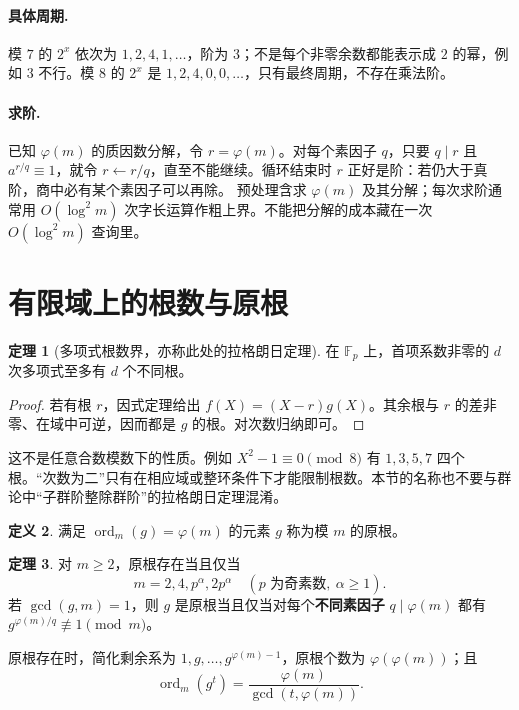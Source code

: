 \documentclass[UTF8,a4paper,11pt,oneside,openany,fontset=fandol]{ctexbook}
\theoremstyle{definition}
\newtheorem{definition}{定义}[chapter]
\newtheorem{theorem}[definition]{定理}
\newcommand{\ord}{\operatorname{ord}}
\begin{document}
\paragraph{具体周期.} 模 $7$ 的 $2^x$ 依次为 $1,2,4,1,\ldots$，阶为 $3$；不是每个非零余数都能表示成 $2$ 的幂，例如 $3$ 不行。模 $8$ 的 $2^x$ 是 $1,2,4,0,0,\ldots$，只有最终周期，不存在乘法阶。
\paragraph{求阶.} 已知 $\varphi(m)$ 的质因数分解，令 $r=\varphi(m)$。对每个素因子 $q$，只要 $q\mid r$ 且 $a^{r/q}\equiv1$，就令 $r\gets r/q$，直至不能继续。循环结束时 $r$ 正好是阶：若仍大于真阶，商中必有某个素因子可以再除。
预处理含求 $\varphi(m)$ 及其分解；每次求阶通常用 $O(\log^2m)$ 次字长运算作粗上界。不能把分解的成本藏在一次 $O(\log^2m)$ 查询里。


\section{有限域上的根数与原根}
\begin{theorem}[多项式根数界，亦称此处的拉格朗日定理]
在 $\mathbb F_p$ 上，首项系数非零的 $d$ 次多项式至多有 $d$ 个不同根。
\end{theorem}
\begin{proof}
若有根 $r$，因式定理给出 $f(X)=(X-r)g(X)$。其余根与 $r$ 的差非零、在域中可逆，因而都是 $g$ 的根。对次数归纳即可。
\end{proof}

\begin{pitfall}
这不是任意合数模数下的性质。例如 $X^2-1\equiv0\pmod8$ 有 $1,3,5,7$ 四个根。“次数为二”只有在相应域或整环条件下才能限制根数。本节的名称也不要与群论中“子群阶整除群阶”的拉格朗日定理混淆。
\end{pitfall}


\begin{definition}
满足 $\ord_m(g)=\varphi(m)$ 的元素 $g$ 称为模 $m$ 的原根。
\end{definition}
\begin{theorem}
对 $m\ge2$，原根存在当且仅当
\[
 m=2,4,p^\alpha,2p^\alpha\quad(p\text{ 为奇素数},\ \alpha\ge1).
\]
若 $\gcd(g,m)=1$，则 $g$ 是原根当且仅当对每个\textbf{不同素因子} $q\mid\varphi(m)$ 都有 $g^{\varphi(m)/q}\not\equiv1\pmod m$。
\end{theorem}
原根存在时，简化剩余系为 $1,g,\ldots,g^{\varphi(m)-1}$，原根个数为 $\varphi(\varphi(m))$；且
\[
 \ord_m(g^t)=\frac{\varphi(m)}{\gcd(t,\varphi(m))}.
\]
\end{document}
